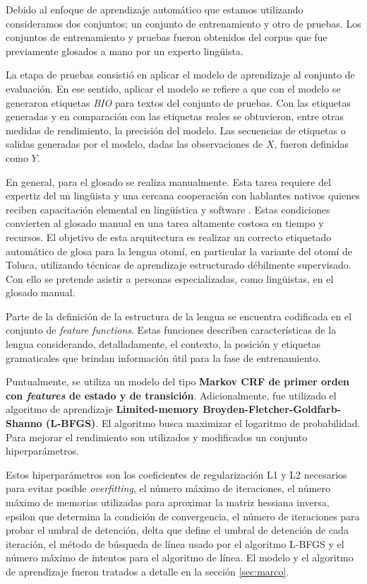 \documentclass[letterpaper,12pt,oneside]{book}
\theoremstyle{definition}
\begin{document}
Debido al enfoque de aprendizaje automático que estamos utilizando consideramos dos conjuntos; un conjunto de entrenamiento y otro de pruebas. Los conjuntos de entrenamiento y pruebas fueron obtenidos del corpus que fue previamente glosados a mano por un experto lingüista.

La etapa de pruebas consistió en aplicar el modelo de aprendizaje al conjunto de evaluación. En ese sentido, aplicar el modelo se refiere a que con el modelo se generaron etiquetas \textit{BIO} para textos del conjunto de pruebas. Con las etiquetas generadas y en comparación con las etiquetas reales se obtuvieron, entre otras medidas de rendimiento, la precisión del modelo. Las secuencias de etiquetas o salidas generadas por el modelo, dadas las observaciones de $X$, fueron definidas como $Y$.

En general, para el glosado se realiza manualmente. Esta tarea requiere del expertiz del un lingüista y una cercana cooperación con hablantes nativos quienes reciben capacitación elemental en lingüística y software \citep{moeller2018automatic}. Estas condiciones convierten al glosado manual en una tarea altamente costosa en tiempo y recursos. El objetivo de esta arquitectura es realizar un correcto etiquetado automático de glosa para la lengua otomí, en particular la variante del otomí de Toluca, utilizando técnicas de aprendizaje estructurado débilmente supervisado. Con ello se pretende asistir a personas especializadas, como lingüistas, en el glosado manual.   

Parte de la definición de la estructura de la lengua se encuentra codificada en el conjunto de \textit{feature functions}. Estas funciones describen características de la lengua considerando, detalladamente, el contexto, la posición y etiquetas gramaticales que brindan información útil para la fase de entrenamiento.

Puntualmente, se utiliza un modelo del tipo \textbf{Markov CRF de primer orden con \textit{features} de estado y de transición}. Adicionalmente, fue utilizado el algoritmo de aprendizaje \textbf{Limited-memory Broyden-Fletcher-Goldfarb-Shanno (L-BFGS)}. El algoritmo busca maximizar el logaritmo de probabilidad. Para mejorar el rendimiento son utilizados y modificados un conjunto hiperparámetros.

Estos hiperparámetros son los coeficientes de regularización L1 y L2 necesarios para evitar posible \textit{overfitting}, el número máximo de iteraciones, el número máximo de memorias utilizadas para aproximar la matriz hessiana inversa, epsilon que determina la condición de convergencia, el número de iteraciones para probar el umbral de detención,  delta que define el umbral de detención de cada iteración, el método de búsqueda de línea usado por el algoritmo L-BFGS y el número máximo de intentos para el algoritmo de línea.
El modelo y el algoritmo de aprendizaje fueron tratados a detalle en la sección \ref{sec:marco}.
\end{document}
